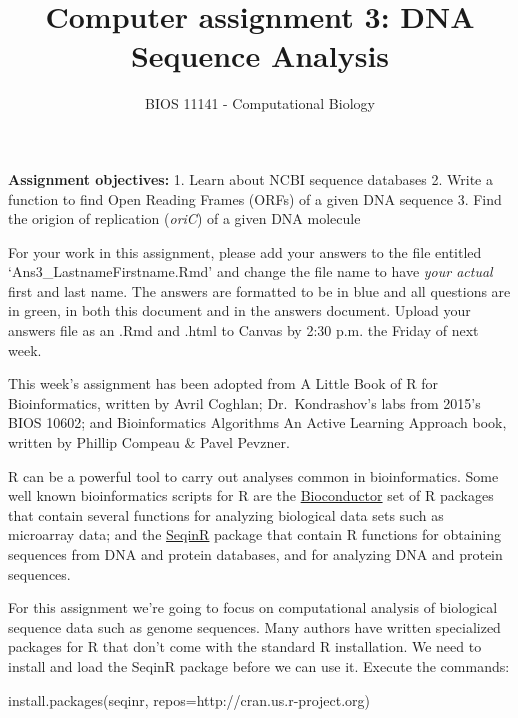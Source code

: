 \documentclass[
]{article}
\title{Computer assignment 3: DNA Sequence Analysis}
\author{BIOS 11141 - Computational Biology}
\date{}
\newenvironment{Shaded}{\begin{snugshade}}{\end{snugshade}}
\newcommand{\AttributeTok}[1]{\textcolor[rgb]{0.77,0.63,0.00}{#1}}
\newcommand{\FunctionTok}[1]{\textcolor[rgb]{0.00,0.00,0.00}{#1}}
\newcommand{\NormalTok}[1]{#1}
\newcommand{\StringTok}[1]{\textcolor[rgb]{0.31,0.60,0.02}{#1}}
\begin{document}
\maketitle

\textbf{Assignment objectives:} 1. Learn about NCBI sequence databases
2. Write a function to find Open Reading Frames (ORFs) of a given DNA
sequence 3. Find the origion of replication (\emph{oriC}) of a given DNA
molecule \span

For your work in this assignment, please add your answers to the file
entitled `Ans3\_LastnameFirstname.Rmd' and change the file name to have
\emph{your actual} first and last name. The answers are formatted to be
in blue and all questions are in green, in both this document and in the
answers document. Upload your answers file as an .Rmd and .html to
Canvas by 2:30 p.m. the Friday of next week. \span  

This week's assignment has been adopted from A Little Book of R for
Bioinformatics, written by Avril Coghlan; Dr.~Kondrashov's labs from
2015's BIOS 10602; and Bioinformatics Algorithms An Active Learning
Approach book, written by Phillip Compeau \& Pavel Pevzner. \span  

R can be a powerful tool to carry out analyses common in bioinformatics.
Some well known bioinformatics scripts for R are the
\href{http://www.bioconductor.org}{Bioconductor} set of R packages that
contain several functions for analyzing biological data sets such as
microarray data; and the
\href{https://cran.r-project.org/web/packages/seqinr/index.html}{SeqinR}
package that contain R functions for obtaining sequences from DNA and
protein databases, and for analyzing DNA and protein sequences.

For this assignment we're going to focus on computational analysis of
biological sequence data such as genome sequences. Many authors have
written specialized packages for R that don't come with the standard R
installation. We need to install and load the SeqinR package before we
can use it. Execute the commands:

\begin{Shaded}
\begin{Highlighting}[]
\FunctionTok{install.packages}\NormalTok{(}\StringTok{\textquotesingle{}seqinr\textquotesingle{}}\NormalTok{, }\AttributeTok{repos=}\StringTok{\textquotesingle{}http://cran.us.r{-}project.org\textquotesingle{}}\NormalTok{)}
\end{Highlighting}
\end{Shaded}
\end{document}
